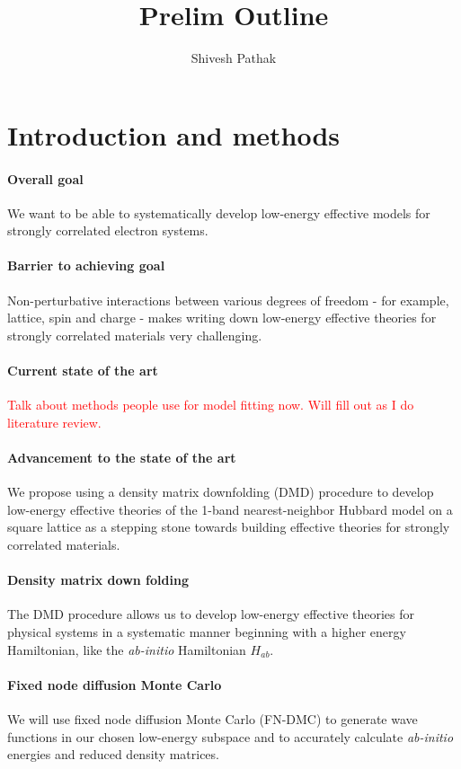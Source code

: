\documentclass{article}
\title{Prelim Outline}
\author{Shivesh Pathak}
\begin{document}
\section{Introduction and methods}
\paragraph{Overall goal} We want to be able to systematically develop low-energy effective models for strongly correlated electron systems.

\paragraph{Barrier to achieving goal} Non-perturbative interactions between various degrees of freedom - for example, lattice, spin and charge - makes writing down low-energy effective theories for strongly correlated materials very challenging.

\paragraph{Current state of the art} \textcolor{red}{Talk about methods people use for model fitting now. Will fill out as I do literature review.}

\paragraph{Advancement to the state of the art} We propose using a density matrix downfolding (DMD) procedure to develop low-energy effective theories of the 1-band nearest-neighbor Hubbard model on a square lattice as a stepping stone towards building effective theories for strongly correlated materials.

\paragraph{Density matrix down folding} 
The DMD procedure allows us to develop low-energy effective theories for physical systems in a systematic manner beginning with a higher energy Hamiltonian, like the \textit{ab-initio} Hamiltonian $H_{ab}$.

\paragraph{Fixed node diffusion Monte Carlo}
We will use fixed node diffusion Monte Carlo (FN-DMC) to generate wave functions in our chosen low-energy subspace and to accurately calculate \textit{ab-initio} energies and reduced density matrices.
\end{document}
